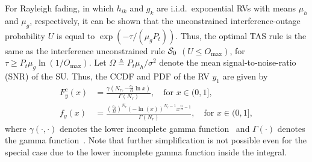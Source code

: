 \documentclass[12pt,draftcls,peerreview,onecolumn]{IEEEtran}
\newcommand{\define}{\triangleq}
\newcommand{\mug}{{\mu_{g}}}
\newcommand{\muh}{{\mu_{h}}}
\newcommand{\Nr}{{N_r}}
\newcommand{\Pt}{{P_t}}
\newcommand{\such}{h}
\newcommand{\puch}{g}
\newcommand{\hk}[1]{{\such_{#1}}}
\newcommand{\gk}[1]{{\puch_{#1}}}
\newcommand{\noisevar}{\sigma^2}
\newcommand{\outmax}{O_{\text{max}}}
\newcommand{\itau}{\tau}
\newcommand{\ctwo}{c_{2}}
\newcommand{\yk}[1]{y_{#1}}
\newcommand{\inlccdfg}[1][]{\exp\left({-{{#1}\itau}/{\left( \mug\Pt\right) }}\right)}
\newcommand{\al}{\ctwo}
\newcommand{\snr}{\Omega}
\newcommand{\albysnr}[1][]{\frac{\al#1}{\snr}}
\newcommand{\un}{U}
\newcommand{\caluncons}{{\cal S_{\text{0}}}}
\newcommand{\ccdfyNr}[1]{\frac{\gamma\left(\Nr,-\albysnr\ln{#1}\right)}{\Gamma\left(\Nr\right)}}
\newcommand{\pdfyNr}{\frac{\left(\albysnr\right)^{\Nr}\left(-\ln\left({x}\right)\right)^{\Nr-1}x^{\albysnr[]-1}}{\Gamma(\Nr)}} %
\newcommand{\pdfyNrgen}[1]{f_{y}\left(#1\right)} %
\newcommand{\ccdfyrv}[1]{ F^{c}_{y}\left(#1 \right) }
\begin{document}
For Rayleigh fading, in which $\hk{ik}$ and $\gk{k}$ are i.i.d.\ exponential RVs with means $\muh$ and $\mug$, respectively, it can be shown that the unconstrained interference-outage probability $\un$ is equal to $\inlccdfg[]$. Thus, the optimal TAS rule is the same as the interference unconstrained rule $\caluncons$ $(\un\leq\outmax)$, for $\itau\geq\Pt\mug\ln\left(1/\outmax\right)$.  Let $\snr\define\Pt\muh/\noisevar$ denote the mean signal-to-noise-ratio (SNR) of the SU. Thus, the CCDF and PDF of the RV $\yk{1}$ are given by 
\begin{align}
\label{eq:ccdfyNr}
\ccdfyrv{x} &= \ccdfyNr{x}, \quad \text{for}\,\, x \in (0,1],\\
\label{eq:pdfyNr}
\pdfyNrgen{x} &= \pdfyNr, \quad \text{for}\,\,  x \in (0,1],
\end{align}
where $\gamma(\cdot,\cdot)$ denotes the lower incomplete gamma function~\cite[(8.350.1)]{gradshteyn00_book} and $\Gamma(\cdot)$ denotes the gamma function~\cite[(8.339.1)]{gradshteyn00_book}. Note that further simplification is not possible even for the special case due to the lower incomplete gamma function inside the integral.  
%
\end{document}
